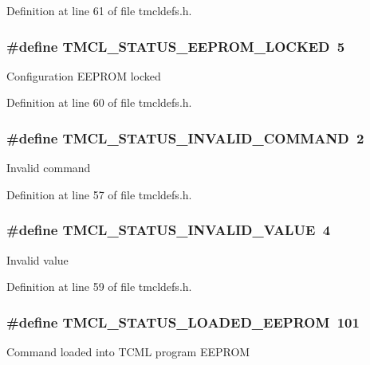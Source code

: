 Definition at line 61 of file tmcldefs.h.\hypertarget{group__StatusCodes_gab3c467b9ae2a256a4d62dd4e7e1922af}{
\subsubsection[{TMCL\_\-STATUS\_\-EEPROM\_\-LOCKED}]{\setlength{\rightskip}{0pt plus 5cm}\#define TMCL\_\-STATUS\_\-EEPROM\_\-LOCKED~5}}
\label{group__StatusCodes_gab3c467b9ae2a256a4d62dd4e7e1922af}
Configuration EEPROM locked 

Definition at line 60 of file tmcldefs.h.\hypertarget{group__StatusCodes_ga61d064f4c9f910aeb110a92489664d48}{
\subsubsection[{TMCL\_\-STATUS\_\-INVALID\_\-COMMAND}]{\setlength{\rightskip}{0pt plus 5cm}\#define TMCL\_\-STATUS\_\-INVALID\_\-COMMAND~2}}
\label{group__StatusCodes_ga61d064f4c9f910aeb110a92489664d48}
Invalid command 

Definition at line 57 of file tmcldefs.h.\hypertarget{group__StatusCodes_ga0d34bdc73a05adf2c2bc7e6038fb6c64}{
\subsubsection[{TMCL\_\-STATUS\_\-INVALID\_\-VALUE}]{\setlength{\rightskip}{0pt plus 5cm}\#define TMCL\_\-STATUS\_\-INVALID\_\-VALUE~4}}
\label{group__StatusCodes_ga0d34bdc73a05adf2c2bc7e6038fb6c64}
Invalid value 

Definition at line 59 of file tmcldefs.h.\hypertarget{group__StatusCodes_gae781af2133cc40ed37e50627769f75f3}{
\subsubsection[{TMCL\_\-STATUS\_\-LOADED\_\-EEPROM}]{\setlength{\rightskip}{0pt plus 5cm}\#define TMCL\_\-STATUS\_\-LOADED\_\-EEPROM~101}}
\label{group__StatusCodes_gae781af2133cc40ed37e50627769f75f3}
Command loaded into TCML program EEPROM 

